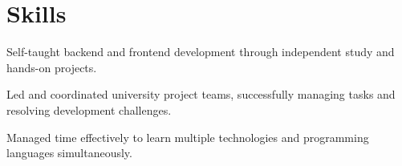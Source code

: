 \section{Skills}

\begin{onecolentry}
        \begin{highlights}
            \item Self-taught backend and frontend development through independent study and hands-on projects.
            \item Led and coordinated university project teams, successfully managing tasks and resolving development challenges.
            \item Managed time effectively to learn multiple technologies and programming languages simultaneously.
        \end{highlights}
    \end{onecolentry}
